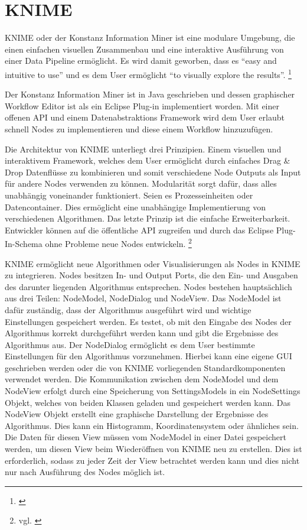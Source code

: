 \section{KNIME}
\label{ch:Grundlagen:sec:knime}
KNIME oder der Konstanz Information Miner ist eine modulare Umgebung, die einen einfachen visuellen Zusammenbau und eine interaktive Ausführung von einer Data Pipeline ermöglicht. Es wird damit geworben, dass es \enquote{easy and intuitive to use} und es dem User ermöglicht \enquote{to visually explore the results}. \footnote{\cite[p. 2]{BCDG+07}} 

Der Konstanz Information Miner ist in Java geschrieben und dessen graphischer Workflow Editor ist als ein Eclipse Plug-in implementiert worden. Mit einer offenen API und einem Datenabstraktions Framework wird dem User erlaubt schnell Nodes zu implementieren und diese einem Workflow hinzuzufügen.

Die Architektur von KNIME unterliegt drei Prinzipien. Einem visuellen und interaktivem Framework, welches dem User ermöglicht durch einfaches Drag \& Drop Datenflüsse zu kombinieren und somit verschiedene Node Outputs als Input für andere Nodes verwenden zu können. Modularität sorgt dafür, dass alles unabhängig voneinander funktioniert. Seien es Prozesseinheiten oder Datencontainer. Dies ermöglicht eine unabhängige Implementierung von verschiedenen Algorithmen. Das letzte Prinzip ist die einfache Erweiterbarkeit. Entwickler können auf die öffentliche API zugreifen und durch das Eclipse Plug-In-Schema ohne Probleme neue Nodes entwickeln. \footnote{vgl. \cite{BCDG+07}}

KNIME ermöglicht neue Algorithmen oder Visualisierungen als Nodes in KNIME zu integrieren. Nodes besitzen In- und Output Ports, die den Ein- und Ausgaben des darunter liegenden Algorithmus entsprechen. Nodes bestehen hauptsächlich aus drei Teilen: NodeModel, NodeDialog und NodeView. Das NodeModel ist dafür zuständig, dass der Algorithmus ausgeführt wird und wichtige Einstellungen gespeichert werden. Es testet, ob mit den Eingabe des Nodes der Algorithmus korrekt durchgeführt werden kann und gibt die Ergebnisse des Algorithmus aus. 
Der NodeDialog ermöglicht es dem User bestimmte Einstellungen für den Algorithmus vorzunehmen. Hierbei kann eine eigene GUI geschrieben werden oder die von KNIME vorliegenden Standardkomponenten verwendet werden. Die Kommunikation zwischen dem NodeModel und dem NodeView erfolgt durch eine Speicherung von SettingsModels in ein NodeSettings Objekt, welches von beiden Klassen geladen und gespeichert werden kann. 
Das NodeView Objekt erstellt eine graphische Darstellung der Ergebnisse des Algorithmus. Dies kann ein Histogramm, Koordinatensystem oder ähnliches sein. Die Daten für diesen View müssen vom NodeModel in einer Datei gespeichert werden, um diesen View beim Wiederöffnen von KNIME neu zu erstellen. Dies ist erforderlich, sodass zu jeder Zeit der View betrachtet werden kann und dies nicht nur nach Ausführung des Nodes möglich ist.


